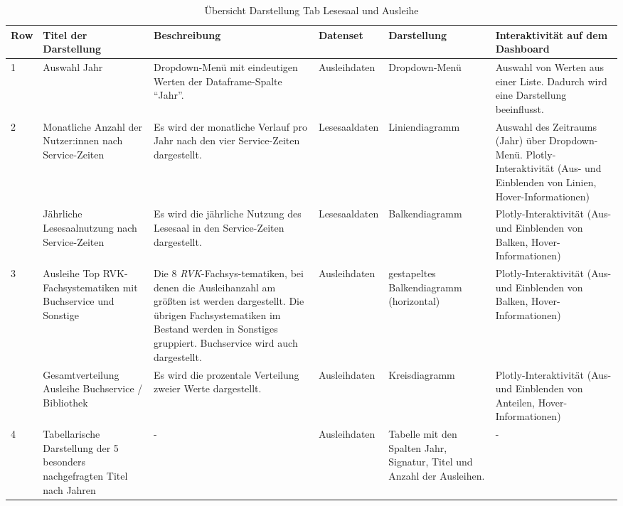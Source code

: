 \clearpage
{}
\recalctypearea  

    \begingroup
    \setlength{\tabcolsep}{12pt} %
    \renewcommand{\arraystretch}{1.5} 
    \begin{table}[h]
        \LARGE
        \centering
        \begin{adjustbox}{max width=\textwidth}
        \begin{tabular}{p{}p{}p{}p{}p{}p{}}
           \toprule
           Row        &Titel der Darstellung&Beschreibung &Datenset &Darstellung &Interaktivität auf dem Dashboard\\
           \midrule
            1           &Auswahl  Jahr &Dropdown-Menü mit eindeutigen Werten der Dataframe-Spalte \enquote{Jahr}.&Ausleihdaten&Dropdown-Menü &Auswahl von Werten aus einer Liste. Dadurch wird eine Darstellung beeinflusst.\\
           \midrule
            2           &Monatliche Anzahl der Nutzer:innen nach Service-Zeiten&Es wird der monatliche Verlauf pro Jahr nach den vier Service-Zeiten dargestellt.&Lesesaaldaten&Liniendiagramm&Auswahl des Zeitraums (Jahr) über Dropdown-Menü. Plotly-Interaktivität (Aus- und Einblenden von Linien, Hover-Informationen)\\
                        &Jährliche Lesesaalnutzung nach Service-Zeiten&Es wird die jährliche Nutzung des Lesesaal in den Service-Zeiten dargestellt.&Lesesaaldaten&Balkendiagramm    &Plotly-Interaktivität (Aus- und Einblenden von Balken, Hover-Informationen)\\          
            \midrule
            3           &Ausleihe Top RVK-Fachsystematiken mit Buchservice und Sonstige&Die 8 \textit{\acrshort{RVK}}-Fachsys-tematiken, bei denen die Ausleihanzahl am größten ist werden dargestellt. Die übrigen Fachsystematiken im Bestand werden in Sonstiges gruppiert. Buchservice wird auch dargestellt.&Ausleihdaten&gestapeltes Balkendiagramm (horizontal)&Plotly-Interaktivität (Aus- und Einblenden von Balken, Hover-Informationen)\\
                        &Gesamtverteilung Ausleihe Buchservice / Bibliothek&Es wird die prozentale Verteilung zweier Werte dargestellt.&Ausleihdaten    &Kreisdiagramm   &Plotly-Interaktivität (Aus- und Einblenden von Anteilen, Hover-Informationen)\\
            \midrule
            4           &Tabellarische Darstellung der 5 besonders nachgefragten Titel nach Jahren&-&Ausleihdaten    &Tabelle mit den Spalten Jahr, Signatur, Titel und Anzahl der Ausleihen.&-\\

        \bottomrule
        \end{tabular}
        \end{adjustbox}
        \caption{%
            Übersicht Darstellung Tab Lesesaal und Ausleihe
        }
        \label{tab:Darstellung Tab Lesesaal und Ausleihe}
        \end{table}
    \endgroup


